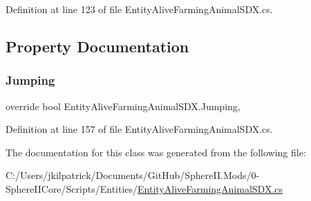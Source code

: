 Definition at line 123 of file Entity\+Alive\+Farming\+Animal\+S\+D\+X.\+cs.



\subsection{Property Documentation}
\mbox{\label{class_entity_alive_farming_animal_s_d_x_a255f1dbd6574483983cf42138fbdc545}} 
\subsubsection{\texorpdfstring{Jumping}{Jumping}}
{\footnotesize\ttfamily override bool Entity\+Alive\+Farming\+Animal\+S\+D\+X.\+Jumping\hspace{0.3cm}{\ttfamily [get]}, {\ttfamily [set]}}



Definition at line 157 of file Entity\+Alive\+Farming\+Animal\+S\+D\+X.\+cs.



The documentation for this class was generated from the following file\+:\begin{DoxyCompactItemize}
\item 
C\+:/\+Users/jkilpatrick/\+Documents/\+Git\+Hub/\+Sphere\+I\+I.\+Mods/0-\/\+Sphere\+I\+I\+Core/\+Scripts/\+Entities/\mbox{\hyperlink{_entity_alive_farming_animal_s_d_x_8cs}{Entity\+Alive\+Farming\+Animal\+S\+D\+X.\+cs}}\end{DoxyCompactItemize}
